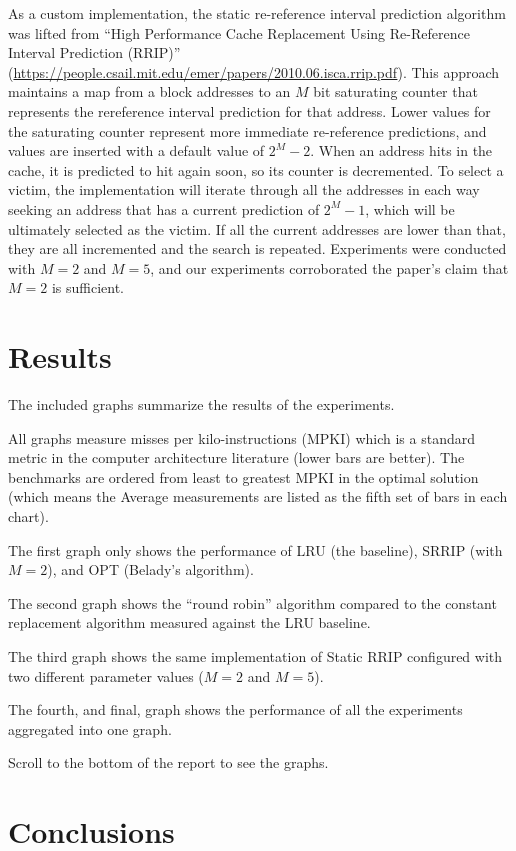 \documentclass[9pt]{article}
\begin{document}
		As a custom implementation, the static re-reference interval prediction algorithm was lifted from ``High Performance Cache Replacement Using Re-Reference Interval Prediction (RRIP)'' (\url{https://people.csail.mit.edu/emer/papers/2010.06.isca.rrip.pdf}). This approach maintains a map from a block addresses to an $M$ bit saturating counter that represents the rereference interval prediction for that address. Lower values for the saturating counter represent more immediate re-reference predictions, and values are inserted with a default value of $2^M - 2$. When an address hits in the cache, it is predicted to hit again soon, so its counter is decremented. To select a victim, the implementation will iterate through all the addresses in each way seeking an address that has a current prediction of $2^M - 1$, which will be ultimately selected as the victim. If all the current addresses are lower than that, they are all incremented and the search is repeated. Experiments were conducted with $M = 2$ and $M = 5$, and our experiments corroborated the paper's claim that $M = 2$ is sufficient. 
	

\section{Results}

	The included graphs summarize the results of the experiments. 

	All graphs measure misses per kilo-instructions (MPKI) which is a standard metric in the computer architecture literature (lower bars are better). The benchmarks are ordered from least to greatest MPKI in the optimal solution (which means the Average measurements are listed as the fifth set of bars in each chart). 

	The first graph only shows the performance of LRU (the baseline), SRRIP (with $M = 2$), and OPT (Belady's algorithm).

	The second graph shows the ``round robin'' algorithm compared to the constant replacement algorithm measured against the LRU baseline. 

	The third graph shows the same implementation of Static RRIP configured with two different parameter values ($M = 2$ and $M = 5$). 

	The fourth, and final, graph shows the performance of all the experiments aggregated into one graph. 

	Scroll to the bottom of the report to see the graphs.

\section{Conclusions}
\end{document}
